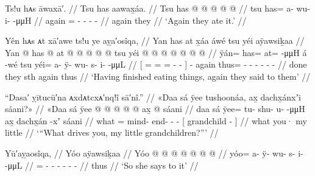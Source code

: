 \ex\label{ex:92-83-again-ate-it}%
%
\begingl
	\glpreamble	Ts!u hᴀs āwaxā′. //
	\glpreamble	Tsu has aawax̱áa. //
	\gla	Tsu has @  @ {} @ {} @ {} @ {} //
	\glb	tsu has= a- wu- i-  -μμH //
	\glc	again = - - -  - //
	\gld	again they  {} {} {} {} //
	\glft	‘Again they ate it.’
		//
\endgl
\xe

\ex\label{ex:92-84-done-eating-said-to}%
%
\begingl
	\glpreamble	Yên hᴀs ᴀt xā′awe ts!u ye aỵa′osîqa, //
	\glpreamble	Yan has at x̱áa áwé tsu yéi aÿawsiḵaa //
	\gla	{} Yan @ has @ at @  @ {} @ {} @ {} {}
		 @ {}
		tsu yéi @  @ {} @ {} @ {} @ {} @ {} @ {} //
	\glb	{} ÿán= has= at= {}  -μμH {} {}
		á -wé
		tsu yéi= a- ÿ- wu- s- i-  -μμL //
	\glc	{}[ = = = -
			 - \· {}]
		 -
		again thus= - - - - -
			 - //
	\gld	{} done they sth  {} {} {} {}
		 {}
		again thus  {} {} {} {} {} {} //
	\glft	‘Having finished eating things, again they said to them’
		//
\endgl
\xe

\ex\label{ex:92-85-what-drove-you}%
%
\begingl
	\glpreamble	“Dasa′ ỵītucū′na ᴀxdᴀtcxᴀ′nq!î sā′nî.” //
	\glpreamble	«\!Daa sá ÿee tushoonáa, ax̱ dachx̱ánxʼi sáani?\!» //
	\gla	«\!Daa sá
		ÿee @  @ {} @ {} @ {} @ {}
		{} ax̱  @ {} sáani {} //
	\glb	\pqp{}daa sá
		ÿee= tu- shu- u-  -μμH
		{} ax̱ dachx̱án -xʼ sáani {}  //
	\glc	\pqp{}what 
		= mind- end- -  -
		{}[  grandchild -  {}] //
	\gld	\pqp{}what 
		you·  {} {} {} {}
		{} my  {} little {} //
	\glft	‘“What drives you, my little grandchildren?”’
		//
\endgl
\xe


\ex\label{ex:92-86-so-says-to-it}%
%
\begingl
	\glpreamble	Yū′aỵaosîqa, //
	\glpreamble	Yóo aÿawsiḵaa //
	\gla	Yóo @  @ {} @ {} @ {} @ {} @ {} @ {} //
	\glb	yóo= a- ÿ- wu- s- i-  -μμL //
	\glc	{}= - - - - -
			 - //
	\gld	thus  {} {} {} {} {} {} //
	\glft	‘So she says to it’
		//
\endgl
\xe

